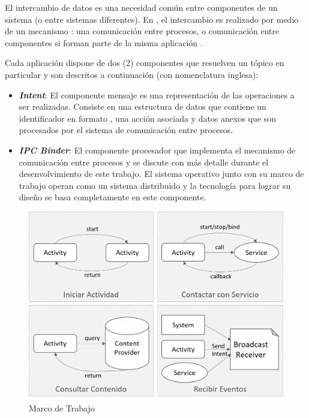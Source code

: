 El intercambio de datos es una necesidad común entre componentes de
un sistema (o entre sistemas diferentes). En , el intercambio
es realizado por medio de un mecanismo : una comunicación
entre procesos, o comunicación entre componentes si forman parte de
la misma aplicación \cite{Schreiber2011}. 

Cada aplicación dispone de dos (2) componentes que resuelven un tópico
en particular y son descritos a continuación (con nomenclatura inglesa):
\begin{itemize}
\item \textbf{\emph{Intent}}: El componente mensaje es una representación
de las operaciones a ser realizadas. Consiste en una estructura de
datos que contiene un identificador en formato , una acción
asociada y datos anexos que son procesados por el sistema de comunicación
entre procesos. 
\item \textbf{\emph{IPC Binder}}: El componente procesador que implementa
el mecanismo de comunicación entre procesos \emph{\cite{Schreiber2011}}
y se discute con más detalle durante el desenvolvimiento de este trabajo\emph{.
}El sistema operativo  junto con su marco de trabajo
operan como un sistema distribuido y la tecnología para lograr su
diseño se basa completamente en este componente.
\end{itemize}
\begin{figure}[H]
\begin{centering}
\includegraphics[width=0.8\columnwidth]{capitulo-5/graphics/mensajes_ipc}
\par\end{centering}
\caption[\emph{Framework Android}]{\label{fig5:mensajes-ipc}Marco de Trabajo }
\end{figure}

